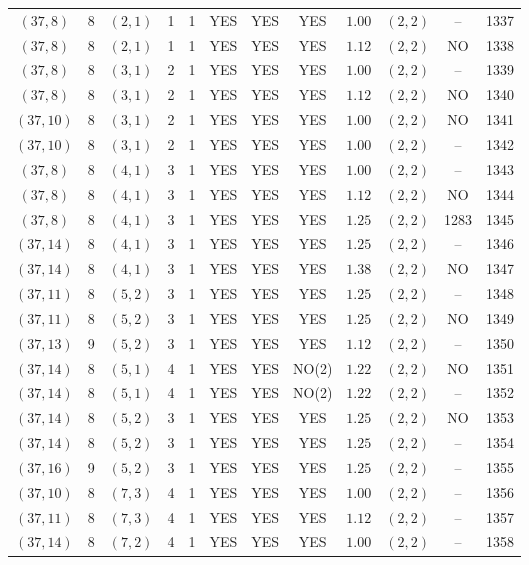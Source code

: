 \begin{longtable}{|c|c|c|c|c|c|c|c|c|c|c|c|}
$(37,8)$ & 8 & $(2,1)$ & 1 & 1 & YES & YES & YES & $1.00$ & $(2,2)$ & -- & 1337\\
$(37,8)$ & 8 & $(2,1)$ & 1 & 1 & YES & YES & YES & $1.12$ & $(2,2)$ & NO & 1338\\
$(37,8)$ & 8 & $(3,1)$ & 2 & 1 & YES & YES & YES & $1.00$ & $(2,2)$ & -- & 1339\\
$(37,8)$ & 8 & $(3,1)$ & 2 & 1 & YES & YES & YES & $1.12$ & $(2,2)$ & NO & 1340\\
$(37,10)$ & 8 & $(3,1)$ & 2 & 1 & YES & YES & YES & $1.00$ & $(2,2)$ & NO & 1341\\
$(37,10)$ & 8 & $(3,1)$ & 2 & 1 & YES & YES & YES & $1.00$ & $(2,2)$ & -- & 1342\\
$(37,8)$ & 8 & $(4,1)$ & 3 & 1 & YES & YES & YES & $1.00$ & $(2,2)$ & -- & 1343\\
$(37,8)$ & 8 & $(4,1)$ & 3 & 1 & YES & YES & YES & $1.12$ & $(2,2)$ & NO & 1344\\
$(37,8)$ & 8 & $(4,1)$ & 3 & 1 & YES & YES & YES & $1.25$ & $(2,2)$ & 1283 & 1345\\
$(37,14)$ & 8 & $(4,1)$ & 3 & 1 & YES & YES & YES & $1.25$ & $(2,2)$ & -- & 1346\\
$(37,14)$ & 8 & $(4,1)$ & 3 & 1 & YES & YES & YES & $1.38$ & $(2,2)$ & NO & 1347\\
$(37,11)$ & 8 & $(5,2)$ & 3 & 1 & YES & YES & YES & $1.25$ & $(2,2)$ & -- & 1348\\
$(37,11)$ & 8 & $(5,2)$ & 3 & 1 & YES & YES & YES & $1.25$ & $(2,2)$ & NO & 1349\\
$(37,13)$ & 9 & $(5,2)$ & 3 & 1 & YES & YES & YES & $1.12$ & $(2,2)$ & -- & 1350\\
$(37,14)$ & 8 & $(5,1)$ & 4 & 1 & YES & YES & NO(2) & $1.22$ & $(2,2)$ & NO & 1351\\
$(37,14)$ & 8 & $(5,1)$ & 4 & 1 & YES & YES & NO(2) & $1.22$ & $(2,2)$ & -- & 1352\\
$(37,14)$ & 8 & $(5,2)$ & 3 & 1 & YES & YES & YES & $1.25$ & $(2,2)$ & NO & 1353\\
$(37,14)$ & 8 & $(5,2)$ & 3 & 1 & YES & YES & YES & $1.25$ & $(2,2)$ & -- & 1354\\
$(37,16)$ & 9 & $(5,2)$ & 3 & 1 & YES & YES & YES & $1.25$ & $(2,2)$ & -- & 1355\\
$(37,10)$ & 8 & $(7,3)$ & 4 & 1 & YES & YES & YES & $1.00$ & $(2,2)$ & -- & 1356\\
$(37,11)$ & 8 & $(7,3)$ & 4 & 1 & YES & YES & YES & $1.12$ & $(2,2)$ & -- & 1357\\
$(37,14)$ & 8 & $(7,2)$ & 4 & 1 & YES & YES & YES & $1.00$ & $(2,2)$ & -- & 1358\\

\end{longtable}
